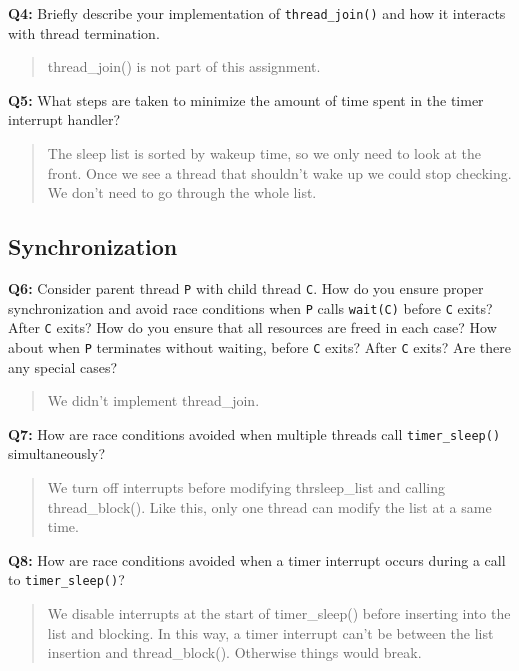 \documentclass[a4paper,11pt]{paper}
\begin{document}
\textbf{Q4:} Briefly describe your implementation of \texttt{thread\_join()} and
how it interacts with thread termination.

\begin{quote}
thread\_join() is not part of this assignment.
\end{quote}

\textbf{Q5:} What steps are taken to minimize the amount of time spent in the
timer interrupt handler?

\begin{quote}
The sleep list is sorted by wakeup time, so we only need to look at the 
front. Once we see a thread that shouldn't wake up we could stop checking. 
We don't need to go through the whole list.
\end{quote}


\subsection{Synchronization}

\textbf{Q6:} Consider parent thread \texttt{P} with child thread \texttt{C}.
How do you ensure proper synchronization and avoid race conditions when
\texttt{P} calls \texttt{wait(C)} before \texttt{C} exits?  After \texttt{C}
exits?  How do you ensure that all resources are freed in each case?  How about
when \texttt{P} terminates without waiting, before \texttt{C} exits?  After
\texttt{C} exits?  Are there any special cases?

\begin{quote}
We didn't implement thread\_join.
\end{quote}

\textbf{Q7:} How are race conditions avoided when multiple threads call
\texttt{timer\_sleep()} simultaneously?

\begin{quote}
We turn off interrupts before modifying thrsleep\_list and calling 
thread\_block(). Like this, only one thread can modify the list at a 
same time.
\end{quote}

\textbf{Q8:} How are race conditions avoided when a timer interrupt occurs
during a call to \texttt{timer\_sleep()}?

\begin{quote}
We disable interrupts at the start of timer\_sleep() before inserting 
into the list and blocking. In this way, a timer interrupt can't be between 
the list insertion and thread\_block(). Otherwise things would break.
\end{quote}
\end{document}

